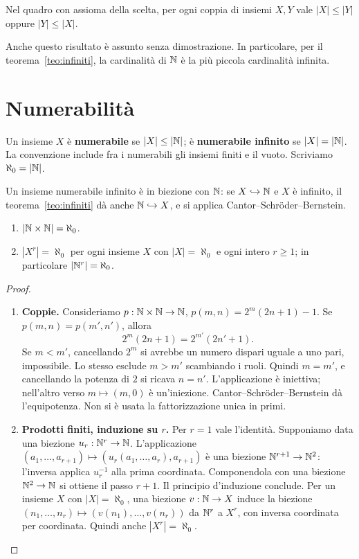 \begin{teorema}
Nel quadro con assioma della scelta, per ogni coppia di insiemi $X,Y$ vale $|X|\le|Y|$ oppure $|Y|\le|X|$.
\end{teorema}
Anche questo risultato è assunto senza dimostrazione. In particolare, per il teorema~\ref{teo:infiniti}, la cardinalità di $\mathbb{N}$ è la più piccola cardinalità infinita.

\section{Numerabilità}
\begin{definizione}
Un insieme $X$ è \textbf{numerabile} se $|X|\le|\mathbb{N}|$; è \textbf{numerabile infinito} se $|X|=|\mathbb{N}|$. La convenzione include fra i numerabili gli insiemi finiti e il vuoto. Scriviamo $\aleph_0=|\mathbb{N}|$.
\end{definizione}

Un insieme numerabile infinito è in biezione con $\mathbb{N}$: se $X\hookrightarrow\mathbb{N}$ e $X$ è infinito, il teorema~\ref{teo:infiniti} dà anche $\mathbb{N}\hookrightarrow X$, e si applica Cantor--Schröder--Bernstein.

\begin{proposizione}
\begin{enumerate}[label=\arabic*.]
\item $|\mathbb{N}\times\mathbb{N}|=\aleph_0$.
\item $|X^r|=\aleph_0$ per ogni insieme $X$ con $|X|=\aleph_0$ e ogni intero $r\ge1$; in particolare $|\mathbb{N}^r|=\aleph_0$.
\end{enumerate}
\end{proposizione}
\begin{proof}
\begin{enumerate}[label=\arabic*.]
\item \textbf{Coppie.} Consideriamo $p:\mathbb{N}\times\mathbb{N}\to\mathbb{N}$, $p(m,n)=2^m(2n+1)-1$. Se $p(m,n)=p(m',n')$, allora
\[
2^m(2n+1)=2^{m'}(2n'+1).
\]
Se $m<m'$, cancellando $2^m$ si avrebbe un numero dispari uguale a uno pari, impossibile. Lo stesso esclude $m>m'$ scambiando i ruoli. Quindi $m=m'$, e cancellando la potenza di $2$ si ricava $n=n'$. L'applicazione è iniettiva; nell'altro verso $m\mapsto(m,0)$ è un'iniezione. Cantor--Schröder--Bernstein dà l'equipotenza. Non si è usata la fattorizzazione unica in primi.
\item \textbf{Prodotti finiti, induzione su $r$.} Per $r=1$ vale l'identità. Supponiamo data una biezione $u_r:\mathbb{N}^r\to\mathbb{N}$. L'applicazione $(a_1,\ldots,a_{r+1})\mapsto(u_r(a_1,\ldots,a_r),a_{r+1})$ è una biezione $\mathbb{N}^{r+1}\to\mathbb{N}^2$: l'inversa applica $u_r^{-1}$ alla prima coordinata. Componendola con una biezione $\mathbb{N}^2\to\mathbb{N}$ si ottiene il passo $r+1$. Il principio d'induzione conclude. Per un insieme $X$ con $|X|=\aleph_0$, una biezione $v:\mathbb{N}\to X$ induce la biezione $(n_1,\ldots,n_r)\mapsto(v(n_1),\ldots,v(n_r))$ da $\mathbb{N}^r$ a $X^r$, con inversa coordinata per coordinata. Quindi anche $|X^r|=\aleph_0$.
\end{enumerate}
\end{proof}

